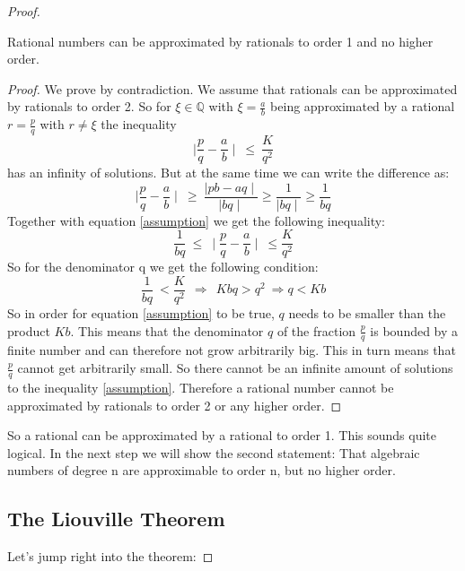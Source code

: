 \documentclass{article}
\theoremstyle{definition}
\begin{document}
\begin{proof}
\begin{theorem}
    Rational numbers can be approximated by rationals to order 1 and no higher order.
\end{theorem}

\begin{proof}
    We prove by contradiction. We assume that rationals can be approximated by rationals to order 2.
    So for $\xi \in \mathbb{Q}$ with $\xi = \frac{a}{b}$ being approximated by a rational $r=\frac{p}{q}$ with $r  \neq \xi $ the inequality 
    \begin{equation}
    \label{assumption}
        \mid \frac{p}{q}-\frac{a}{b}\mid \: \leq \:  \frac{K}{q^2}
    \end{equation}
    has an infinity of solutions. But at the same time we can write the difference as:
    \begin{equation}
        \mid \frac{p}{q}-\frac{a}{b}\mid \: \geq \:  \frac{\mid pb-aq \mid}{\mid bq \mid} \geq  \frac{1}{\mid bq \mid } \geq \frac{1}{bq}
    \end{equation}
    Together with equation \ref{assumption} we get the following inequality:
    \begin{equation}
      \frac{1}{bq}\: \leq \:  \mid \frac{p}{q}-\frac{a}{b}\mid \: \leq \frac{K}{q^2}  
    \end{equation}
    So for the denominator q we get the following condition:
    \begin{equation}
        \frac{1}{bq}\: < \frac{K}{q^2}  \: \:  \Rightarrow \: \: Kbq > q^2 \: \Rightarrow q < Kb
    \end{equation}
    So in order for equation \ref{assumption} to be true, $q$ needs to be smaller than the product $Kb$. This means that the denominator $q$ of the fraction $\frac{p}{q}$ is bounded by a finite number and can therefore not grow arbitrarily big. This in turn means that $\frac{p}{q}$ cannot get arbitrarily small. So there cannot be an infinite amount of solutions to the inequality \ref{assumption}. Therefore a rational number cannot be approximated by rationals to order 2 or any higher order. 
\end{proof}
So a rational can be approximated by a rational to order 1. This sounds quite logical. In the next step we will show the second statement: That algebraic numbers of degree n are approximable to order n, but no higher order.


\subsection{The Liouville Theorem}
Let's jump right into the theorem:


\end{proof}
\end{document}
